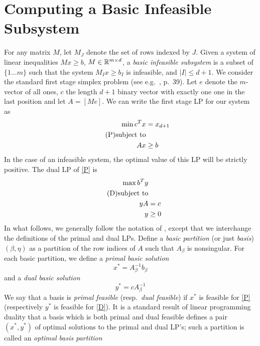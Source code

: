 \documentclass[charterfonts,lotsofwhite]{patmorin}
\begin{document}
\appendix
\section{Computing a Basic Infeasible Subsystem}

For any matrix $M$, let $M_J$ denote the set of rows indexed by $J$.
Given a system of linear inequalities $Mx \geq b$, $M \in \mathbb{R}^{m \times
  d}$, a \emph{basic infeasible subsystem} is a subset of $\{ 1 \dots
m\}$ such that the system $M_I x \geq b_I$ is infeasible, and $|I|
\leq d+1$. 
 We consider the standard first stage simplex
problem (see e.g.~\cite{chvatal80}, p.~39). Let  $e$ denote the
$m$-vector of all ones, $c$ the length $d+1$ binary vector with
exactly one one in the last position and let $A=[M e]$. We can write the first stage LP for our system as
\begin{align*}
    \min c^Tx &= x_{d+1}\\\tag{P}\eqlabel{P}
    \text{subject to}\\
    Ax &\geq b
\end{align*}
  In the case of an
infeasible system, the optimal value of this LP will be strictly
positive. 
The dual LP of \eqref{P} is
\begin{align*}
  \max b^T y\\\tag{D}
  \eqlabel{D}
  \text{subject to}\\
  yA &= c\\
  y & \geq 0
\end{align*}
In what follows, we generally follow the notation of \cite{megiddo91},
except that we interchange the definitions of the primal and dual LPs.
Define a \emph{basic partition} (or just \emph{basis}) $(\beta,\eta)$
as a partition of the row indices of $A$ such that $A_\beta$ is
nonsingular.  For each basic partition, we define a \emph{primal basic
  solution}
\begin{equation*}
  x^*=A_\beta^{-1} b_\beta
\end{equation*}
and a \emph{dual basic solution}
\begin{equation*}
  y^*= c A^{-1}_\beta
\end{equation*}
We say that a basis is \emph{primal feasible} (resp.\ \emph{dual
  feasible}) if $x^*$ is feasible for \eqref{P} (respectively $y^*$
is feasible for \eqref{D}).  It is a standard result of linear
programming duality that a basis which is both primal and dual feasible
defines a pair $(x^*,y^*)$ of optimal solutions to the primal and dual
LP's; such a partition is called an \emph{optimal basis partition}
\end{document}
